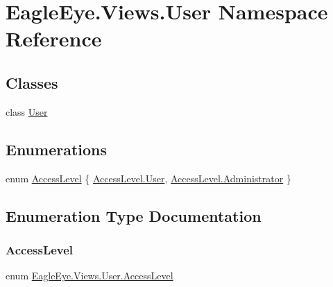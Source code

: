 \hypertarget{namespace_eagle_eye_1_1_views_1_1_user}{}\section{Eagle\+Eye.\+Views.\+User Namespace Reference}
\label{namespace_eagle_eye_1_1_views_1_1_user}
\subsection*{Classes}
\begin{DoxyCompactItemize}
\item 
class \mbox{\hyperlink{class_eagle_eye_1_1_views_1_1_user_1_1_user}{User}}
\end{DoxyCompactItemize}
\subsection*{Enumerations}
\begin{DoxyCompactItemize}
\item 
enum \mbox{\hyperlink{namespace_eagle_eye_1_1_views_1_1_user_a5ec08150416703595770d50460878d89}{Access\+Level}} \{ \mbox{\hyperlink{namespace_eagle_eye_1_1_views_1_1_user_a5ec08150416703595770d50460878d89a8f9bfe9d1345237cb3b2b205864da075}{Access\+Level.\+User}}, 
\mbox{\hyperlink{namespace_eagle_eye_1_1_views_1_1_user_a5ec08150416703595770d50460878d89a7b7bc2512ee1fedcd76bdc68926d4f7b}{Access\+Level.\+Administrator}}
 \}
\end{DoxyCompactItemize}


\subsection{Enumeration Type Documentation}
\mbox{\label{namespace_eagle_eye_1_1_views_1_1_user_a5ec08150416703595770d50460878d89}} 
\subsubsection{\texorpdfstring{AccessLevel}{AccessLevel}}
{\footnotesize\ttfamily enum \mbox{\hyperlink{namespace_eagle_eye_1_1_views_1_1_user_a5ec08150416703595770d50460878d89}{Eagle\+Eye.\+Views.\+User.\+Access\+Level}}\hspace{0.3cm}{\ttfamily [strong]}}

